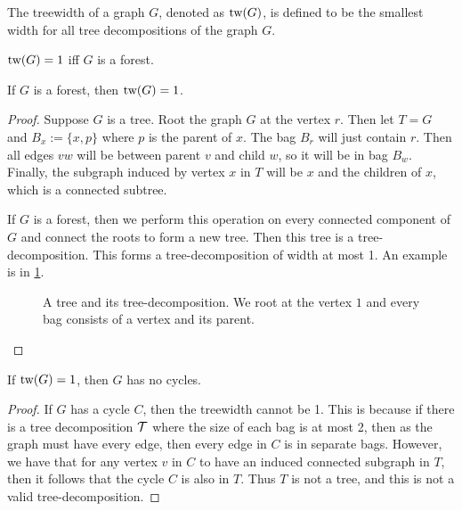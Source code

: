 \begin{definition}\label{def:treewidth}
	The treewidth of a graph $G$, denoted as $\text{tw}(G)$, is defined to be the smallest width for all tree decompositions of the graph $G$.
\end{definition}


\begin{example}\label{ex:treewidth_forest}
	$\text{tw}(G) = 1$ iff $G$ is a forest.
	\begin{lemma}
		If $G$ is a forest, then $\text{tw}(G) = 1$.
	\end{lemma}
	\begin{proof}
		Suppose $G$ is a tree. Root the graph $G$ at the vertex $r$. Then let $T = G$ and $B_x:= \lbrace x, p \rbrace$ where $p$ is the parent of $x$. The bag $B_r$ will just contain $r$. Then all edges $vw$ will be between parent $v$ and child $w$, so it will be in bag $B_w$. Finally, the subgraph induced by vertex $x$ in $T$ will be $x$ and the children of $x$, which is a connected subtree.
		
		If $G$ is a forest, then we perform this operation on every connected component of $G$ and connect the roots to form a new tree. Then this tree is a tree-decomposition. This forms a tree-decomposition of width at most 1. An example is in \cref{fig:tree-treedecomp}. 
		\begin{figure}[h]
			\centering
			
			
			\caption{A tree and its tree-decomposition. We root at the vertex $1$ and every bag consists of a vertex and its parent.}
			\label{fig:tree-treedecomp}
		\end{figure}
	\end{proof}
	\begin{lemma}
		If $\text{tw}(G) = 1$, then $G$ has no cycles.
	\end{lemma}
	\begin{proof}
		If $G$ has a cycle $C$, then the treewidth cannot be 1. This is because if there is a tree decomposition $\mathcal{T}$ where the size of each bag is at most 2, then as the graph must have every edge, then every edge in $C$ is in separate bags. However, we have that for any vertex $v$ in $C$ to have an induced connected subgraph in $T$, then it follows that the cycle $C$ is also in $T$. Thus $T$ is not a tree, and this is not a valid tree-decomposition. 
	\end{proof}
\end{example}

